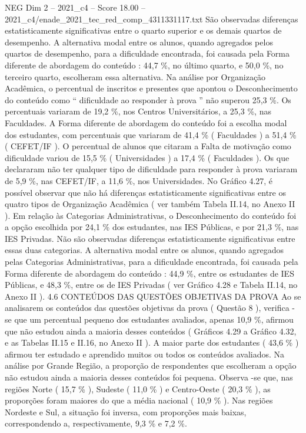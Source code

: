 \begin{textsample}{NEG Dim 2 – 2021\_c4 – Score 18.00 – 2021\_c4/enade\_2021\_tec\_red\_comp\_4311331117.txt}
São observadas diferenças estatisticamente significativas entre o quarto superior e os demais quartos de desempenho.
A alternativa modal entre os alunos, quando agregados pelos quartos de desempenho, para a dificuldade encontrada, foi causada pela Forma diferente de abordagem do conteúdo : 44,7 \%, no último quarto, e 50,0 \%, no terceiro quarto, escolheram essa alternativa.
Na análise por Organização Acadêmica, o percentual de inscritos e presentes que apontou o Desconhecimento do conteúdo como “ dificuldade ao responder à prova ” não superou 25,3 \%.
Os percentuais variaram de 19,2 \%, nos Centros Universitários, a 25,3 \%, nas Faculdades.
A Forma diferente de abordagem do conteúdo foi a escolha modal dos estudantes, com percentuais que variaram de 41,4 \% ( Faculdades ) a 51,4 \% ( CEFET/IF ).
O percentual de alunos que citaram a Falta de motivação como dificuldade variou de 15,5 \% ( Universidades ) a 17,4 \% ( Faculdades ).
Os que declararam não ter qualquer tipo de dificuldade para responder à prova variaram de 5,9 \%, nas CEFET/IF, a 11,6 \%, nos Universidades.
No Gráfico 4.27, é possível observar que não há diferenças estatisticamente significativas entre os quatro tipos de Organização Acadêmica ( ver também Tabela II.14, no Anexo II ).
Em relação às Categorias Administrativas, o Desconhecimento do conteúdo foi a opção escolhida por 24,1 \% dos estudantes, nas IES Públicas, e por 21,3 \%, nas IES Privadas.
Não são observadas diferenças estatisticamente significativas entre essas duas categorias.
A alternativa modal entre os alunos, quando agregados pelas Categorias Administrativas, para a dificuldade encontrada, foi causada pela Forma diferente de abordagem do conteúdo : 44,9 \%, entre os estudantes de IES Públicas, e 48,3 \%, entre os de IES Privadas ( ver Gráfico 4.28 e Tabela II.14, no Anexo II ). 4.6 CONTEÚDOS DAS QUESTÕES OBJETIVAS DA PROVA Ao se analisarem os conteúdos das questões objetivas da prova ( Questão 8 ), verifica -se que um percentual pequeno dos estudantes avaliados, apenas 10,9 \%, afirmou que não estudou ainda a maioria desses conteúdos ( Gráficos 4.29 a Gráfico 4.32, e as Tabelas II.15 e II.16, no Anexo II ).
A maior parte dos estudantes ( 43,6 \% ) afirmou ter estudado e aprendido muitos ou todos os conteúdos avaliados.
Na análise por Grande Região, a proporção de respondentes que escolheram a opção não estudou ainda a maioria desses conteúdos foi pequena.
Observa -se que, nas regiões Norte ( 15,7 \% ), Sudeste ( 11,0 \% ) e Centro-Oeste ( 20,3 \% ), as proporções foram maiores do que a média nacional ( 10,9 \% ).
Nas regiões Nordeste e Sul, a situação foi inversa, com proporções mais baixas, correspondendo a, respectivamente, 9,3 \% e 7,2 \%.

\end{textsample}
